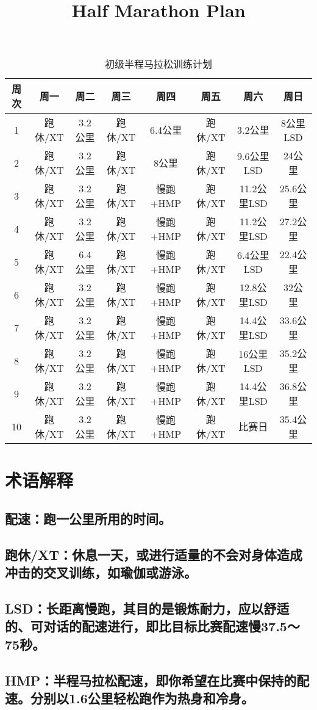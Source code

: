 \documentclass{article}
\title{Half Marathon Plan}
\author{}
\date{}
\begin{document}
\maketitle

\begin{table}[h!]
\centering
\begin{tabular}{@{}cccccccc@{}}
\toprule
周次 & 周一    & 周二    & 周三    & 周四       & 周五       & 周六        & 周日        \\ 
\midrule
1    & 跑休/XT & 3.2公里 & 跑休/XT & 6.4公里    & 跑休/XT    & 3.2公里     & 8公里LSD  \\
2    & 跑休/XT & 3.2公里 & 跑休/XT & 8公里      & 跑休/XT    & 9.6公里LSD  & 24公里     \\
3    & 跑休/XT & 3.2公里 & 跑休/XT & 慢跑+HMP   & 跑休/XT    & 11.2公里LSD & 25.6公里   \\
4    & 跑休/XT & 3.2公里 & 跑休/XT & 慢跑+HMP   & 跑休/XT    & 11.2公里LSD & 27.2公里   \\
5    & 跑休/XT & 6.4公里 & 跑休/XT & 慢跑+HMP   & 跑休/XT    & 6.4公里LSD  & 22.4公里   \\
6    & 跑休/XT & 3.2公里 & 跑休/XT & 慢跑+HMP   & 跑休/XT    & 12.8公里LSD & 32公里     \\
7    & 跑休/XT & 3.2公里 & 跑休/XT & 慢跑+HMP   & 跑休/XT    & 14.4公里LSD & 33.6公里   \\
8    & 跑休/XT & 3.2公里 & 跑休/XT & 慢跑+HMP   & 跑休/XT    & 16公里LSD   & 35.2公里   \\
9    & 跑休/XT & 3.2公里 & 跑休/XT & 慢跑+HMP   & 跑休/XT    & 14.4公里LSD & 36.8公里   \\
10   & 跑休/XT & 3.2公里 & 跑休/XT & 慢跑+HMP   & 跑休/XT    & 比赛日      & 35.4公里   \\ 
\bottomrule
\end{tabular}
\caption{初级半程马拉松训练计划}
\end{table}
\vspace{3mm}
\section{术语解释}
\subsection{配速：跑一公里所用的时间。}
\subsection{跑休/XT：休息一天，或进行适量的不会对身体造成冲击的交叉训练，如瑜伽或游泳。}
\subsection{LSD：长距离慢跑，其目的是锻炼耐力，应以舒适的、可对话的配速进行，即比目标比赛配速慢37.5～75秒。}
\subsection{HMP：半程马拉松配速，即你希望在比赛中保持的配速。分别以1.6公里轻松跑作为热身和冷身。}
\end{document}
